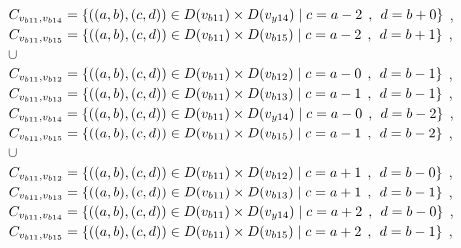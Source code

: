 \\$C_{v_{b11},v_{b14}}=\{((a,b),(c,d))\in D(v_{b11}) \times D(v_{y14})\mid c = a - 2\hspace{1ex} , \hspace{1ex}  d = b + 0 \}$ , 
\\$C_{v_{b11},v_{b15}}=\{((a,b),(c,d))\in D(v_{b11}) \times D(v_{b15})\mid c = a - 2\hspace{1ex} , \hspace{1ex}  d = b + 1 \}$ , 
\\$\cup$
\\$C_{v_{b11},v_{b12}}=\{((a,b),(c,d))\in D(v_{b11}) \times D(v_{b12})\mid c = a - 0\hspace{1ex} , \hspace{1ex}  d = b - 1 \}$ , 
\\$C_{v_{b11},v_{b13}}=\{((a,b),(c,d))\in D(v_{b11}) \times D(v_{b13})\mid c = a - 1\hspace{1ex} , \hspace{1ex}  d = b - 1 \}$ , 
\\$C_{v_{b11},v_{b14}}=\{((a,b),(c,d))\in D(v_{b11}) \times D(v_{y14})\mid c = a - 0\hspace{1ex} , \hspace{1ex}  d = b - 2 \}$ , 
\\$C_{v_{b11},v_{b15}}=\{((a,b),(c,d))\in D(v_{b11}) \times D(v_{b15})\mid c = a - 1\hspace{1ex} , \hspace{1ex}  d = b - 2 \}$ , 
\\$\cup$
\\$C_{v_{b11},v_{b12}}=\{((a,b),(c,d))\in D(v_{b11}) \times D(v_{b12})\mid c = a + 1\hspace{1ex} , \hspace{1ex}  d = b - 0 \}$ , 
\\$C_{v_{b11},v_{b13}}=\{((a,b),(c,d))\in D(v_{b11}) \times D(v_{b13})\mid c = a + 1\hspace{1ex} , \hspace{1ex}  d = b - 1 \}$ , 
\\$C_{v_{b11},v_{b14}}=\{((a,b),(c,d))\in D(v_{b11}) \times D(v_{y14})\mid c = a + 2\hspace{1ex} , \hspace{1ex}  d = b - 0 \}$ , 
\\$C_{v_{b11},v_{b15}}=\{((a,b),(c,d))\in D(v_{b11}) \times D(v_{b15})\mid c = a + 2\hspace{1ex} , \hspace{1ex}  d = b - 1 \}$ , 
